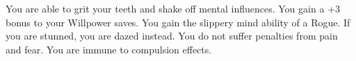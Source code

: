 {You are able to grit your teeth and shake off mental influences.}
{You gain a +3 bonus to your Willpower saves.}
{You gain the slippery mind ability of a Rogue.}
{If you are stunned, you are dazed instead.}
{You do not suffer penalties from pain and fear.}
{You are immune to compulsion effects.}